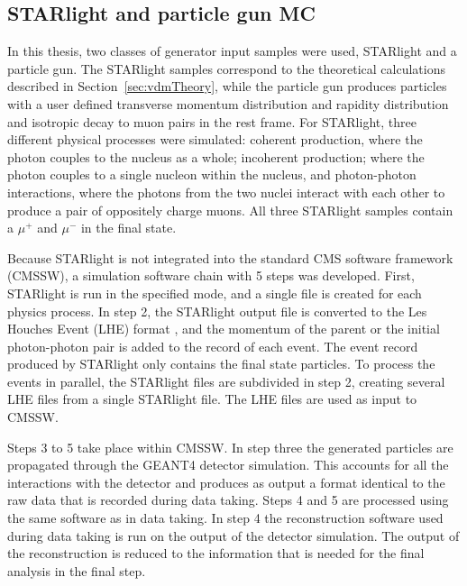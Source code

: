   \subsection{STARlight and particle gun MC}
    In this thesis, two classes of generator input samples were used, 
      STARlight \cite{vmd1999, starlight} and a particle gun.
    The STARlight samples correspond to the theoretical calculations 
      described in Section~\ref{sec:vdmTheory}, while the particle gun produces
      particles with a user defined transverse momentum distribution and 
      rapidity distribution and isotropic decay to muon pairs in the \JPsi{} 
      rest frame. 
    For STARlight, three different physical processes were simulated:
      coherent \JPsi{} production, where the photon couples to the nucleus as
      a whole; incoherent \JPsi{} production; where the photon couples to a
      single nucleon within the nucleus, and photon-photon interactions, where 
      the photons from the two nuclei interact with each other to produce a 
      pair of oppositely charge muons.
    All three STARlight samples contain a $\mu^{+}$ and $\mu^{-}$ in the final 
      state.

    Because STARlight is not integrated into the standard CMS software 
      framework (CMSSW), a simulation software chain with 5 steps 
      was developed.
    First, STARlight is run in the specified mode, and a single file is 
      created for each physics process. 
    In step 2, the STARlight output file is converted to the Les Houches Event 
      (LHE) format \cite{lheFormat}, and the momentum of the parent \JPsi{} or 
      the initial photon-photon pair is added to the record of each event.
    The event record produced by STARlight only contains the final state 
      particles.
    To process the events in parallel, the STARlight files are subdivided 
      in step 2, creating several LHE files from a single STARlight file.
    The LHE files are used as input to CMSSW.

    Steps 3 to 5 take place within CMSSW. 
    In step three the generated particles are propagated through the GEANT4 
      \cite{geant} detector simulation.
    This accounts for all the interactions with the detector and produces as 
      output a format identical to the raw data that is recorded during data
      taking.
    Steps 4 and 5 are processed using the same software as in data taking.
    In step 4 the reconstruction software used during data taking is run on 
      the output of the detector simulation.
    The output of the reconstruction is reduced to the information that is 
      needed for the final analysis in the final step.


